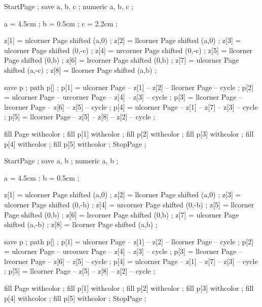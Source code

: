StartPage ;
save a, b, c ;
numeric a, b, c ;

a = 4.5cm ;
b = 0.5cm ;
c = 2.2cm ;

z[1] = ulcorner Page shifted (a,0) ;
z[2] = llcorner Page shifted (a,0) ;
z[3] = ulcorner Page shifted (0,-c) ;
z[4] = urcorner Page shifted (0,-c) ;
z[5] = llcorner Page shifted (0,b) ;
z[6] = lrcorner Page shifted (0,b) ;
z[7] = ulcorner Page shifted (a,-c) ;
z[8] = llcorner Page shifted (a,b) ;

save p ;
path p[] ;
p[1] = ulcorner Page -- z[1] -- z[2] -- llcorner Page -- cycle ;
p[2] = ulcorner Page -- urcorner Page -- z[4] -- z[3] -- cycle ;
p[3] = llcorner Page -- lrcorner Page -- z[6] -- z[5] -- cycle ;
p[4] = ulcorner Page -- z[1] -- z[7] -- z[3] -- cycle ;
p[5] = llcorner Page -- z[5] -- z[8] -- z[2] -- cycle ;

fill Page withcolor  ;
fill p[1] withcolor  ;
fill p[2] withcolor  ;
fill p[3] withcolor  ;
fill p[4] withcolor  ;
fill p[5] withcolor  ;
StopPage ;
\stopuseMPgraphic

StartPage ;
save a, b ;
numeric a, b ;

a = 4.5cm ;
b = 0.5cm ;

z[1] = ulcorner Page shifted (a,0) ;
z[2] = llcorner Page shifted (a,0) ;
z[3] = ulcorner Page shifted (0,-b) ;
z[4] = urcorner Page shifted (0,-b) ;
z[5] = llcorner Page shifted (0,b) ;
z[6] = lrcorner Page shifted (0,b) ;
z[7] = ulcorner Page shifted (a,-b) ;
z[8] = llcorner Page shifted (a,b) ;

save p ;
path p[] ;
p[1] = ulcorner Page -- z[1] -- z[2] -- llcorner Page -- cycle ;
p[2] = ulcorner Page -- urcorner Page -- z[4] -- z[3] -- cycle ;
p[3] = llcorner Page -- lrcorner Page -- z[6] -- z[5] -- cycle ;
p[4] = ulcorner Page -- z[1] -- z[7] -- z[3] -- cycle ;
p[5] = llcorner Page -- z[5] -- z[8] -- z[2] -- cycle ;

fill Page withcolor  ;
fill p[1] withcolor  ;
fill p[2] withcolor  ;
fill p[3] withcolor  ;
fill p[4] withcolor  ;
fill p[5] withcolor  ;
StopPage ;
\stopuseMPgraphic


